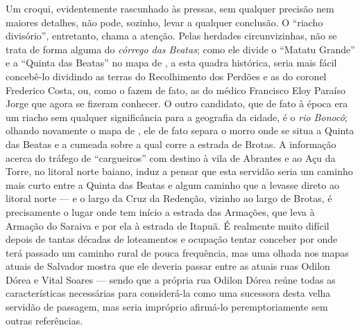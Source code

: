 Um croqui, evidentemente rascunhado às pressas, sem qualquer precisão nem maiores detalhes, não pode, sozinho, levar a qualquer conclusão. O ``riacho divisório'', entretanto, chama a atenção. Pelas herdades circunvizinhas, não se trata de forma alguma do \textit{córrego das Beatas}; como ele divide o ``Matatu Grande'' e a ``Quinta das Beatas'' no mapa de , a esta quadra histórica, seria mais fácil concebê-lo dividindo as terras do Recolhimento dos Perdões e as do coronel Frederico Costa, ou, como o fazem de fato, as do médico Francisco Eloy Paraíso Jorge que agora se fizeram conhecer. O outro candidato, que de fato à época era um riacho sem qualquer significância para a geografia da cidade, é o \textit{rio Bonocô}; olhando novamente o mapa de , ele de fato separa o morro onde se situa a Quinta das Beatas e a cumeada sobre a qual corre a estrada de Brotas. A informação acerca do tráfego de ``cargueiros'' com destino à vila de Abrantes e ao Açu da Torre, no litoral norte baiano, induz a pensar que esta servidão seria um caminho mais curto entre a Quinta das Beatas e algum caminho que a levasse direto ao litoral norte --- e o largo da Cruz da Redenção, vizinho ao largo de Brotas, é precisamente o lugar onde tem início a estrada das Armações, que leva à Armação do Saraiva e por ela à estrada de Itapuã. É realmente muito difícil depois de tantas décadas de loteamentos e ocupação tentar conceber por onde terá passado um caminho rural de pouca frequência, mas uma olhada nos mapas atuais de Salvador mostra que ele deveria passar entre as atuais ruas Odilon Dórea e Vital Soares --- sendo que a própria rua Odilon Dórea reúne todas as características necessárias para considerá-la como uma sucessora desta velha servidão de passagem, mas seria impróprio afirmá-lo peremptoriamente sem outras referências.

